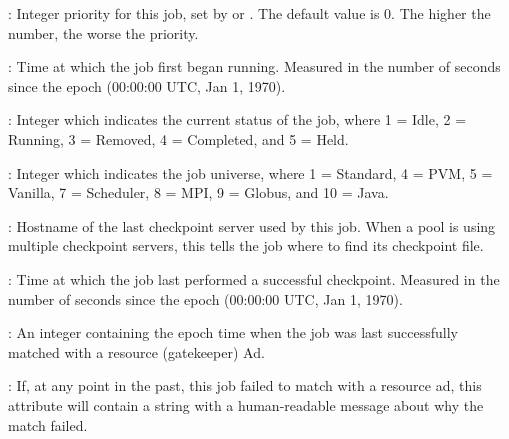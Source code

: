 \begin{description}
\item[\AdAttr{JobPrio}] : Integer priority for this job, set by
 or .  The default value is 0.  The higher
the number, the worse the priority.

\item[\AdAttr{JobStartDate}] : Time at which the job first began
running.  Measured in the
number of seconds since the epoch (00:00:00 UTC, Jan 1, 1970).

\item[\AdAttr{JobStatus}] : Integer which indicates the current
status of the job, where 1 = Idle, 2 = Running, 3 = Removed, 4 =
Completed, and 5 = Held.

\item[\AdAttr{JobUniverse}] : Integer which indicates the job
universe, where 1 = Standard, 4 = PVM, 5 = Vanilla, 7 = Scheduler,
8 = MPI, 9 = Globus, and 10 = Java.

\item[\AdAttr{LastCkptServer}] : Hostname of the last checkpoint
server used by this job.  When a pool is using multiple checkpoint
servers, this tells the job where to find its checkpoint file.

\item[\AdAttr{LastCkptTime}] : Time at which the job last performed a
successful checkpoint.  Measured in the number of seconds since the
epoch (00:00:00 UTC, Jan 1, 1970).

\item[\AdAttr{LastMatchTime}] : An integer containing the epoch time
when the job was last successfully matched with a resource (gatekeeper) Ad.

\item[\AdAttr{LastRejMatchReason}] :  If, at any point in the past,
this job failed to match with a resource ad,
this attribute will contain a string with a
human-readable message about why the match failed.


\end{description}
